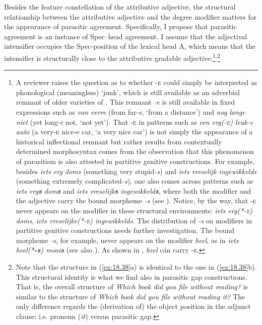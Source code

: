 \documentclass[output=paper]{langsci/langscibook}
\begin{document}
Besides the feature constellation of the attributive adjective, the structural
relationship between the attributive adjective and the degree modifier matters
for the appearance of parasitic agreement. Specifically, I propose that
parasitic agreement is an instance of Spec--head agreement. I assume that the
adjectival intensifier occupies the Spec-position of the lexical head A, which
means that the intensifier is structurally close to the attributive gradable
adjective:\footnote{A reviewer raises the question as to whether \textsc{-e}
could simply be interpreted as phonological (meaningless) \enquote*{junk},
which is still available as an adverbial remnant of older varieties of
. This remnant \emph{-e} is still available in fixed expressions
such as \emph{van verre} (from far-\emph{e}, \enquote*{from a distance}) and
\emph{nog} \emph{lange} \emph{niet} (yet long-\emph{e} not, \enquote*{not
yet}). That \textsc{-e}  in patterns such as \emph{een erg(\textsc{-e}) leuk-e
auto} (a very\textsc{-e} nice-e car, \enquote*{a very nice car}) is not simply
the appearance of a historical inflectional remnant but rather results from
contextually determined morphosyntax comes from the observation that this
phenomenon of parasitism is also attested in partitive genitive constructions. For example, besides \emph{iets erg doms} (something very
stupid\emph{-s}) and \emph{iets vreselijk ingewikkelds} (something extremely
complicated\emph{-s}), one also comes across patterns such as \emph{iets
erg\textbf{s} dom\textbf{s}} and \emph{iets vreselijk\textbf{s}
ingewikkeld\textbf{s}}, where both the modifier and the adjective carry the
bound morpheme \emph{-s} (see \citealt{Royen1948}). Notice, by the way, that
\textsc{-e} never appears on the modifier in these structural environments:
\emph{iets erg(*-\textsc{e}) doms}, \emph{iets vreselijke(*\textsc{-e})
ingewikkelds.} The distribution of \emph{-s} on modifiers in partitive
genitive constructions needs further investigation. The bound
morpheme \emph{-s}, for example, never appears on the modifier \emph{heel}, as
in \emph{iets heel(*\textbf{-s}) mooi\textbf{s}} (see also
\citealt[423]{Broekhuis2013}). As shown in , \emph{heel} cán
carry \textsc{-e}.}\textsuperscript{,}\footnote{Note that the structure in (\ref{ex:18.38}a) is
identical to the one in (\ref{ex:18.38}b). This structural identity is what we
find also in parasitic gap constructions. That is, the overall structure of
\emph{Which book did you file without reading?} is similar to the structure of
\emph{Which book did you file without reading it?} The only difference regards
the (derivation of) the object position in the adjunct clause; i.e. pronoun
(\emph{it}) versus parasitic gap.}
\end{document}

